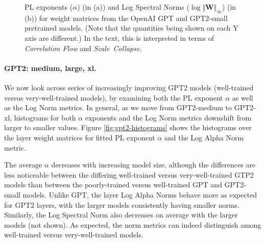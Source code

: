 \begin{figure}[htb]
    \centering
    \quad
    \caption{PL exponents ($\alpha$) (in (a)) and Log Spectral Norms ($\log\Vert\mathbf{W}\Vert_{\infty}$) (in (b)) for weight matrices from the OpenAI GPT and GPT2-small pretrained models.  (Note that the quantities being shown on each Y axis are different.)
             In the text, this is interpreted in terms of \emph{Correlation Flow} and \emph{Scale~Collapse}.
            }
    \label{fig:gpt-alpha-layers}
\end{figure}


\paragraph{GPT2: medium, large, xl.} 

We now look across series of increasingly improving GPT2 models (well-trained versus very-well-trained models), by examining both the PL exponent $\alpha$ as well as the Log Norm metrics.  
In general, as we move from GPT2-medium to GPT2-xl, histograms for both $\alpha$ exponents and the Log Norm metrics downshift from larger to smaller values. 
Figure \ref{fig:gpt2-histograms} shows the histograms over the layer weight matrices for fitted PL exponent $\alpha$ and the Log Alpha Norm metric. 

The average $\alpha$ decreases with increasing model size, although the differences are less noticeable between the differing well-trained 
versus very-well-trained GTP2 models than between the poorly-trained versus well-trained GPT and GPT2-small models.
Unlike GPT, the layer Log Alpha Norms behave more as expected for GPT2 layers, with the larger models consistently having smaller norms. 
Similarly, the Log Spectral Norm also decreases on average with the larger models (not shown).  
As expected, the norm metrics can indeed distinguish among well-trained versus very-well-trained models.

